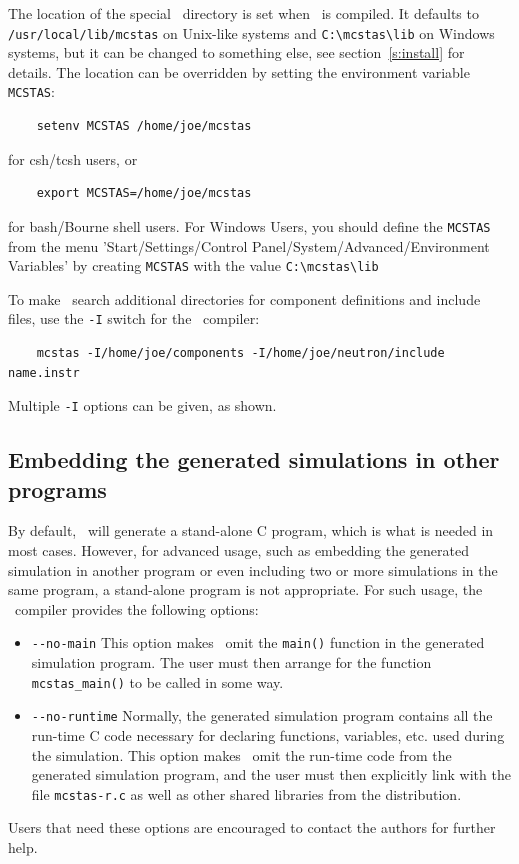 The location of the special \MCS\ directory is set when \MCS\ is
compiled. It defaults to \verb+/usr/local/lib/mcstas+ on Unix-like systems and \verb+C:\mcstas\lib+ on Windows systems, but it can be
changed to something else, see section~\ref{s:install} for
details. The location can be overridden by setting the environment
variable \verb+MCSTAS+: 
\begin{verbatim}
    setenv MCSTAS /home/joe/mcstas
\end{verbatim}
for csh/tcsh users, or
\begin{verbatim}
    export MCSTAS=/home/joe/mcstas
\end{verbatim}
for bash/Bourne shell users.
For Windows Users, you should define the \verb+MCSTAS+ from the menu 'Start/Settings/Control Panel/System/Advanced/Environment
Variables' by creating \verb+MCSTAS+ with the value \verb+C:\mcstas\lib+

To make \MCS\ search additional directories for component definitions
and include files, use the \verb+-I+ switch for the \MCS\ compiler:
\begin{verbatim}
    mcstas -I/home/joe/components -I/home/joe/neutron/include name.instr
\end{verbatim}
Multiple \verb+-I+ options can be given, as shown.


\subsection{Embedding the generated simulations in other programs}

By default, \MCS\ will generate a stand-alone C program, which is what
is needed in most cases. However, for advanced usage, such as embedding
the generated simulation in another program or even including two or
more simulations in the same program, a stand-alone program is not
appropriate. For such usage, the \MCS\ compiler provides the following
options:
\begin{itemize}
\item \verb+--no-main+ This option makes \MCS\ omit the \verb+main()+
  function in the generated simulation program. The user must then
  arrange for the function \verb+mcstas_main()+ to be called in some
  way.
\item \verb+--no-runtime+ Normally, the
  generated simulation program contains all the run-time C code necessary for
  declaring functions, variables, etc. used during the simulation.  This
  option makes \MCS\ omit the run-time code from the generated
  simulation program, and the user must then explicitly link with the file
  \verb+mcstas-r.c+ as well as other shared libraries from the \MCS{} distribution.
\end{itemize}
Users that need these options are encouraged to contact the authors for
further help.



